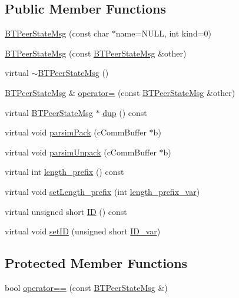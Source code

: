 \subsection*{Public Member Functions}
\begin{DoxyCompactItemize}
\item 
\hyperlink{classBTPeerStateMsg_ab7d14b0f1d4efff5a78abd8b6a1d857d}{B\+T\+Peer\+State\+Msg} (const char $\ast$name=N\+U\+L\+L, int kind=0)
\item 
\hyperlink{classBTPeerStateMsg_a5c60767152d203f9c1b539fb1e6ca7cf}{B\+T\+Peer\+State\+Msg} (const \hyperlink{classBTPeerStateMsg}{B\+T\+Peer\+State\+Msg} \&other)
\item 
virtual \hyperlink{classBTPeerStateMsg_aadb697d2f314297b44ce4b99b9ef01c9}{$\sim$\+B\+T\+Peer\+State\+Msg} ()
\item 
\hyperlink{classBTPeerStateMsg}{B\+T\+Peer\+State\+Msg} \& \hyperlink{classBTPeerStateMsg_add8adb86d08e11cb1a836c8374a03503}{operator=} (const \hyperlink{classBTPeerStateMsg}{B\+T\+Peer\+State\+Msg} \&other)
\item 
virtual \hyperlink{classBTPeerStateMsg}{B\+T\+Peer\+State\+Msg} $\ast$ \hyperlink{classBTPeerStateMsg_a73cc28ed5a32f0f89c43de5513549460}{dup} () const 
\item 
virtual void \hyperlink{classBTPeerStateMsg_ad7476812a0163cb9e40a2a5aaf3e4c81}{parsim\+Pack} (c\+Comm\+Buffer $\ast$b)
\item 
virtual void \hyperlink{classBTPeerStateMsg_a41a706a3d36a9ad449bd7a0e260c7ca3}{parsim\+Unpack} (c\+Comm\+Buffer $\ast$b)
\item 
virtual int \hyperlink{classBTPeerStateMsg_a06b4c4e77f189574c6938358c2195ed7}{length\+\_\+prefix} () const 
\item 
virtual void \hyperlink{classBTPeerStateMsg_a581d8941765c73c6381c8222011bbfe9}{set\+Length\+\_\+prefix} (int \hyperlink{classBTPeerStateMsg_ade7e3e6dbe30b3bdd9e796215e6a1ec6}{length\+\_\+prefix\+\_\+var})
\item 
virtual unsigned short \hyperlink{classBTPeerStateMsg_aa9c6f9b590d1d509d2338c9e18793331}{I\+D} () const 
\item 
virtual void \hyperlink{classBTPeerStateMsg_ac577434d76afb18476583b018a7c04d5}{set\+I\+D} (unsigned short \hyperlink{classBTPeerStateMsg_a10914bbd68aee3cf35b7a1718c7a0e9d}{I\+D\+\_\+var})
\end{DoxyCompactItemize}
\subsection*{Protected Member Functions}
\begin{DoxyCompactItemize}
\item 
bool \hyperlink{classBTPeerStateMsg_a58637665e79ee29402f85af914d16ffb}{operator==} (const \hyperlink{classBTPeerStateMsg}{B\+T\+Peer\+State\+Msg} \&)
\end{DoxyCompactItemize}
